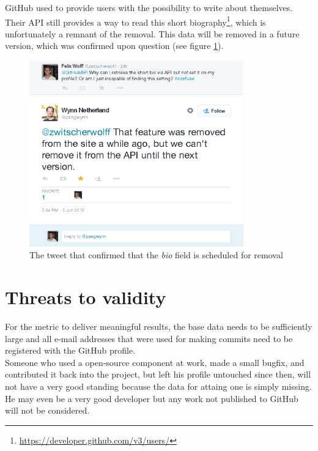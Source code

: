 GitHub used to provide users with the possibility to write about themselves.
Their API still provides a way to read this short biography\footnote{\url{https://developer.github.com/v3/users/}}, which is unfortunately a
remnant of the removal. This data will be removed in a future version,
which was confirmed upon question (see figure \ref{fig:gapitweet}).

\begin{figure}
  \centering
  \includegraphics[width=25em]{gfx/githubapi_tweet.png}
  \caption{The tweet that confirmed that the \textit{bio} field is scheduled for removal}
  \label{fig:gapitweet}
\end{figure}

\section{Threats to validity}\label{sec:threatstovalidity}
For the metric to deliver meaningful results, the base data
needs to be sufficiently large and all e-mail addresses that were used for
making commits need to be registered with the GitHub profile.\\

Someone who used a open-source component at work, made a small bugfix,
and contributed it back into the project, but left his profile untouched
since then, will not have a very good standing because the data
for attaing one is simply missing. He may even be a very good developer
but any work not published to GitHub will not be considered.
